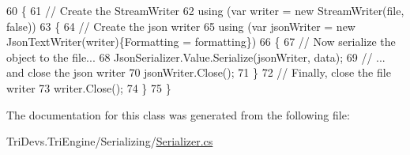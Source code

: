 \begin{DoxyCode}
60         \{
61             \textcolor{comment}{// Create the StreamWriter}
62             \textcolor{keyword}{using} (var writer = \textcolor{keyword}{new} StreamWriter(file, \textcolor{keyword}{false}))
63             \{
64                 \textcolor{comment}{// Create the json writer}
65                 \textcolor{keyword}{using} (var jsonWriter = \textcolor{keyword}{new} JsonTextWriter(writer)\{Formatting = formatting\})
66                 \{
67                     \textcolor{comment}{// Now serialize the object to the file...}
68                     JsonSerializer.Value.Serialize(jsonWriter, data);
69                     \textcolor{comment}{// ... and close the json writer}
70                     jsonWriter.Close();
71                 \}
72                 \textcolor{comment}{// Finally, close the file writer}
73                 writer.Close();
74             \}
75         \}
\end{DoxyCode}


The documentation for this class was generated from the following file\-:\begin{DoxyCompactItemize}
\item 
Tri\-Devs.\-Tri\-Engine/\-Serializing/\hyperlink{_serializer_8cs}{Serializer.\-cs}\end{DoxyCompactItemize}
